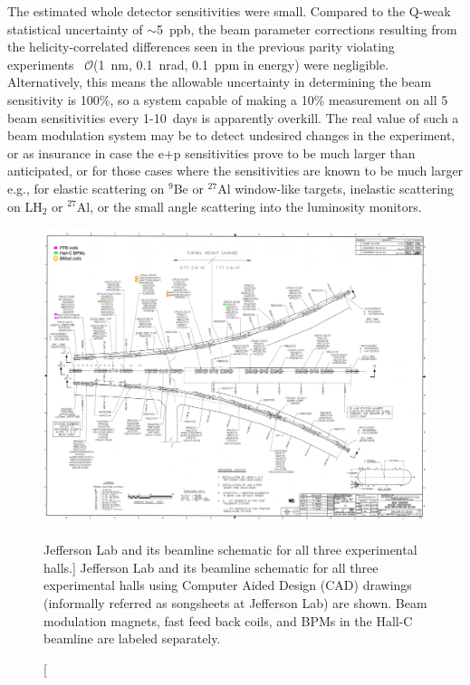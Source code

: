 The estimated whole detector sensitivities were small. Compared to the Q-weak statistical uncertainty of $\sim$5~ppb, the beam parameter corrections resulting from the helicity-correlated differences seen in the previous parity violating experiments~\cite{PhysRevLett.98.032301} $\mathcal{O}$(1~nm, 0.1~nrad, 0.1~ppm in energy) were negligible. Alternatively, this means the allowable uncertainty in determining the beam sensitivity is 100\%, so a system capable of making a 10\% measurement on all 5 beam sensitivities every 1-10~days is apparently overkill. The real value of such a beam modulation system may be to detect undesired changes in the experiment, or as insurance in case the e+p sensitivities prove to be much larger than anticipated, or for those cases where the sensitivities are known to be much larger e.g., for elastic scattering on $^{9}$Be or $^{27}$Al window-like targets, inelastic scattering on LH$_{2}$ or $^{27}$Al, or the small angle scattering into the luminosity monitors. 


\begin{singlespace}
\begin{figure}[!h]
	\begin{center}
	\includegraphics[width=15.0cm]{figures/beamline_songsheet}
	\end{center}
	\caption
	[Jefferson Lab and its beamline schematic for all three experimental halls.]
	{Jefferson Lab and its beamline schematic for all three experimental halls using Computer Aided Design (CAD) drawings (informally referred as songsheets at Jefferson Lab) are shown. Beam modulation magnets, fast feed back coils, and BPMs in the Hall-C beamline are labeled separately.}
	\label{fig:beamline_songsheet}
\end{figure}
\end{singlespace}

